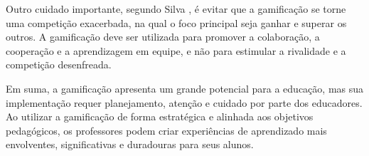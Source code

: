 Outro cuidado importante, segundo Silva \cite{silva2017recurso}, é evitar que a gamificação se torne uma competição exacerbada, na qual o foco principal seja ganhar e superar os outros. A gamificação deve ser utilizada para promover a colaboração, a cooperação e a aprendizagem em equipe, e não para estimular a rivalidade e a competição desenfreada.

Em suma, a gamificação apresenta um grande potencial para a educação, mas sua implementação requer planejamento, atenção e cuidado por parte dos educadores. Ao utilizar a gamificação de forma estratégica e alinhada aos objetivos pedagógicos, os professores podem criar experiências de aprendizado mais envolventes, significativas e duradouras para seus alunos.







